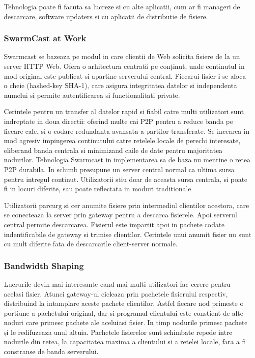 Tehnologia poate fi facuta sa lucreze si cu alte aplicatii, cum ar fi manageri
de descarcare, software updaters si cu aplicatii de distributie de fisiere.

\subsubsection{SwarmCast at Work}

Swarmcast se bazeaza pe modul in care clientii de Web solicita fisiere de la
un server HTTP Web. Ofera o arhitectura centrată pe conținut, unde continutul
in mod original este publicat si apartine serverului central. Fiecarui fisier
i se aloca o cheie (hashed-key SHA-1), care asigura integritatea datelor si
independenta numelui si permite autentificarea si functionalitati private. 

Cerintele pentru un transfer al datelor rapid si fiabil catre multi
utilizatori sunt indreptate in doua directii: oferind multe cai P2P pentru a
reduce banda pe fiecare cale, si o codare redundanta avansata a partilor
transferate. Se incearca in mod agresiv impingerea continutului catre retelele
locale de perechi interesate, eliberand banda centrala si minimizand caile de
date pentru majoritatea nodurilor. Tehnologia Swarmcast in implementarea sa de
baza nu mentine o retea P2P durabila. In schimb presupune un server central
normal ca ultima sursa pentru intregul continut. Utilizatorii stiu doar de
aceasta sursa centrala, si poate fi in locuri diferite, sau poate reflectata
in moduri traditionale.

Utilizatorii parcurg si cer anumite fisiere prin intermediul clientilor
acestora, care se conecteaza la server prin gateway pentru a descarca
fisierele. Apoi serverul central permite descarcarea. Fisierul este impartit
apoi in pachete codate indentificabile de gateway si trimise clientilor.
Cerintele unui anumit fisier nu sunt cu mult diferite fata de descarcarile
client-server normale.

\subsubsection{Bandwidth Shaping}

Lucrurile devin mai interesante cand mai multi utilizatori fac cerere pentru
acelasi fisier. Atunci gateway-ul cicleaza prin pachetele fisierului
respectiv, distribuind la intamplare aceste pachete  clientilor. Astfel
fiecare nod primeste o portiune a pachetului original, dar si programul
clientului este constient de alte noduri care primesc pachete ale aceluiasi
fisier. In timp nodurile primesc pachete și le redifuzeaza unul altuia.
Pachetele fisierelor sunt schimbate repede intre nodurile din rețea, la
capacitatea maxima a clientului si a retelei locale, fara a fi constranse de
banda serverului.

